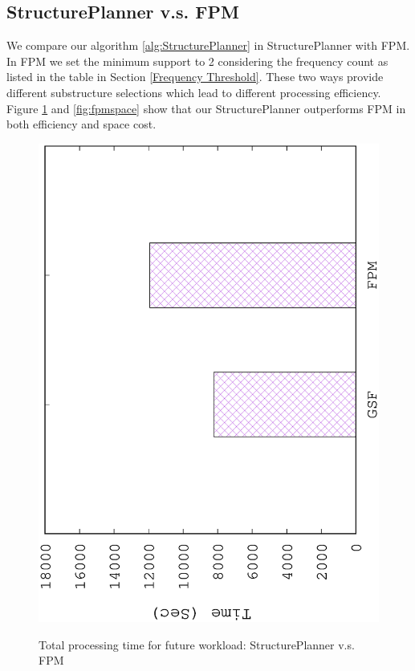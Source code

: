 \subsection{StructurePlanner v.s. FPM}
\label{StructurePlanner v.s. FPM}
We compare our algorithm \ref{alg:StructurePlanner} in StructurePlanner with FPM. In FPM we set the minimum support to 2 considering the frequency count as listed in the table in Section \ref{Frequency Threshold}. These two ways provide different substructure selections which lead to different processing efficiency. Figure \ref{fig:fpm} and \ref{fig:fpmspace} show that our StructurePlanner outperforms FPM in both efficiency and space cost.

\begin{figure}[H]
	\centering
	\includegraphics[scale=0.5, angle=270]{plot/fpm}
	\label{fig:fpm}
	\caption{Total processing time for future workload: StructurePlanner v.s. FPM}
\end{figure}

